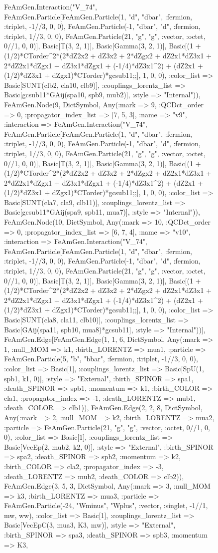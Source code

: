 \documentclass{revtex4}
\begin{document}
\begin{figure}[!htb]
\begin{center}
{FeAmGen.Interaction("V_74", FeAmGen.Particle[FeAmGen.Particle(1, "d", "dbar", :fermion, :triplet, -1//3, 0, 0), FeAmGen.Particle(-1, "dbar", "d", :fermion, :triplet, 1//3, 0, 0), FeAmGen.Particle(21, "g", "g", :vector, :octet, 0//1, 0, 0)], Basic[T(3, 2, 1)], Basic[Gamma(3, 2, 1)], Basic[(1 + (1/2)*CTorder^2*(2*dZ2x2 + dZ3x2 + 2*dZgx2 + dZ2x1*dZ3x1 + 2*dZ2x1*dZgx1 + dZ3x1*dZgx1 + (-1/4)*dZ3x1^2) + (dZ2x1 + (1/2)*dZ3x1 + dZgx1)*CTorder)*gcsub11;;], 1, 0, 0), :color_list => Basic[SUNT(clb2, cla10, clb9)], :couplings_lorentz_list => Basic[gcsub11*GAij(spa10, spb9, mub2)], :style => "Internal")), FeAmGen.Node(9, Dict{Symbol, Any}(:mark => 9, :QCDct_order => 0, :propagator_index_list => [7, 5, 3], :name => "v9", :interaction => FeAmGen.Interaction("V_74", FeAmGen.Particle[FeAmGen.Particle(1, "d", "dbar", :fermion, :triplet, -1//3, 0, 0), FeAmGen.Particle(-1, "dbar", "d", :fermion, :triplet, 1//3, 0, 0), FeAmGen.Particle(21, "g", "g", :vector, :octet, 0//1, 0, 0)], Basic[T(3, 2, 1)], Basic[Gamma(3, 2, 1)], Basic[(1 + (1/2)*CTorder^2*(2*dZ2x2 + dZ3x2 + 2*dZgx2 + dZ2x1*dZ3x1 + 2*dZ2x1*dZgx1 + dZ3x1*dZgx1 + (-1/4)*dZ3x1^2) + (dZ2x1 + (1/2)*dZ3x1 + dZgx1)*CTorder)*gcsub11;;], 1, 0, 0), :color_list => Basic[SUNT(cla7, cla9, clb11)], :couplings_lorentz_list => Basic[gcsub11*GAij(spa9, spb11, mua7)], :style => "Internal")), FeAmGen.Node(10, Dict{Symbol, Any}(:mark => 10, :QCDct_order => 0, :propagator_index_list => [6, 7, 4], :name => "v10", :interaction => FeAmGen.Interaction("V_74", FeAmGen.Particle[FeAmGen.Particle(1, "d", "dbar", :fermion, :triplet, -1//3, 0, 0), FeAmGen.Particle(-1, "dbar", "d", :fermion, :triplet, 1//3, 0, 0), FeAmGen.Particle(21, "g", "g", :vector, :octet, 0//1, 0, 0)], Basic[T(3, 2, 1)], Basic[Gamma(3, 2, 1)], Basic[(1 + (1/2)*CTorder^2*(2*dZ2x2 + dZ3x2 + 2*dZgx2 + dZ2x1*dZ3x1 + 2*dZ2x1*dZgx1 + dZ3x1*dZgx1 + (-1/4)*dZ3x1^2) + (dZ2x1 + (1/2)*dZ3x1 + dZgx1)*CTorder)*gcsub11;;], 1, 0, 0), :color_list => Basic[SUNT(cla8, cla11, clb10)], :couplings_lorentz_list => Basic[GAij(spa11, spb10, mua8)*gcsub11], :style => "Internal"))], FeAmGen.Edge[FeAmGen.Edge(1, 1, 6, Dict{Symbol, Any}(:mark => 1, :null_MOM => k1, :birth_LORENTZ => mua1, :particle => FeAmGen.Particle(5, "b", "bbar", :fermion, :triplet, -1//3, 0, 0), :color_list => Basic[1], :couplings_lorentz_list => Basic[SpU(1, spb1, k1, 0)], :style => "External", :birth_SPINOR => spa1, :death_SPINOR => spb1, :momentum => k1, :birth_COLOR => cla1, :propagator_index => -1, :death_LORENTZ => mub1, :death_COLOR => clb1)), FeAmGen.Edge(2, 2, 8, Dict{Symbol, Any}(:mark => 2, :null_MOM => k2, :birth_LORENTZ => mua2, :particle => FeAmGen.Particle(21, "g", "g", :vector, :octet, 0//1, 0, 0), :color_list => Basic[1], :couplings_lorentz_list => Basic[VecEp(2, mub2, k2, 0)], :style => "External", :birth_SPINOR => spa2, :death_SPINOR => spb2, :momentum => k2, :birth_COLOR => cla2, :propagator_index => -3, :death_LORENTZ => mub2, :death_COLOR => clb2)), FeAmGen.Edge(3, 5, 3, Dict{Symbol, Any}(:mark => 3, :null_MOM => k3, :birth_LORENTZ => mua3, :particle => FeAmGen.Particle(-24, "Wminus", "Wplus", :vector, :singlet, -1//1, mw, ww), :color_list => Basic[1], :couplings_lorentz_list => Basic[VecEpC(3, mua3, K3, mw)], :style => "External", :birth_SPINOR => spa3, :death_SPINOR => spb3, :momentum => K3, }
\end{center}
\end{figure}
\end{document}
